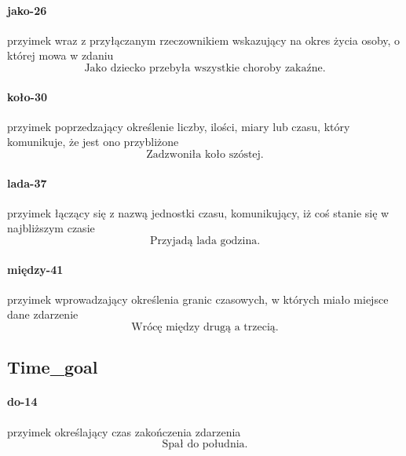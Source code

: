 \documentclass[a4paper, 12pt]{article}
\theoremstyle{remark}
\begin{document}
\paragraph{jako-26} \label{prep-26}	przyimek wraz z przyłączanym rzeczownikiem wskazujący na okres życia osoby, o której mowa w zdaniu
\begin{equation}
\text{Jako dziecko przebyła wszystkie choroby zakaźne.}
\end{equation}
\paragraph{koło-30} \label{prep-30}	przyimek poprzedzający określenie liczby, ilości, miary lub czasu, który komunikuje, że jest ono przybliżone
\begin{equation}
\text{Zadzwoniła koło szóstej.}
\end{equation}
\paragraph{lada-37} \label{prep-37}	przyimek łączący się z nazwą jednostki czasu, komunikujący, iż coś stanie się w najbliższym czasie
\begin{equation}
\text{Przyjadą lada godzina.}
\end{equation}
\paragraph{między-41} \label{prep-41}	przyimek wprowadzający określenia granic czasowych, w których miało miejsce dane zdarzenie
\begin{equation}
\text{Wrócę między drugą a trzecią.}
\end{equation}

\subsection{Time\_goal} %
\label{sub:time_goal}
\paragraph{do-14} \label{prep-14}	przyimek określający czas zakończenia zdarzenia
\begin{equation}
\text{Spał do południa.}
\end{equation}

\end{document}
